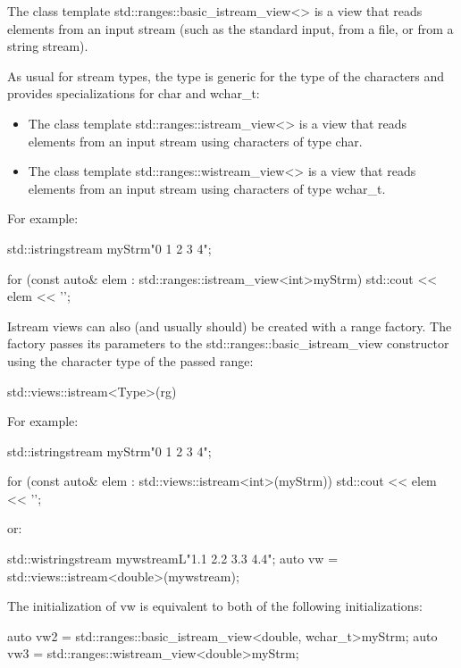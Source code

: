 The class template std::ranges::basic\_istream\_view<> is a view that reads elements from an input stream (such as the standard input, from a file, or from a string stream).

As usual for stream types, the type is generic for the type of the characters and provides specializations for char and wchar\_t:

\begin{itemize}
\item
The class template std::ranges::istream\_view<> is a view that reads elements from an input stream using characters of type char.

\item
The class template std::ranges::wistream\_view<> is a view that reads elements from an input stream using characters of type wchar\_t.
\end{itemize}

For example:

\begin{cpp}
std::istringstream myStrm{"0 1 2 3 4"};

for (const auto& elem : std::ranges::istream_view<int>{myStrm}) {
	std::cout << elem << '\n';
}
\end{cpp}


Istream views can also (and usually should) be created with a range factory. The factory passes its parameters to the std::ranges::basic\_istream\_view constructor using the character type of the passed range:

\begin{cpp}
std::views::istream<Type>(rg)
\end{cpp}

For example:

\begin{cpp}
std::istringstream myStrm{"0 1 2 3 4"};

for (const auto& elem : std::views::istream<int>(myStrm)) {
	std::cout << elem << '\n';
}
\end{cpp}

or:

\begin{cpp}
std::wistringstream mywstream{L"1.1 2.2 3.3 4.4"};
auto vw = std::views::istream<double>(mywstream);
\end{cpp}

The initialization of vw is equivalent to both of the following initializations:

\begin{cpp}
auto vw2 = std::ranges::basic_istream_view<double, wchar_t>{myStrm};
auto vw3 = std::ranges::wistream_view<double>{myStrm};
\end{cpp}

